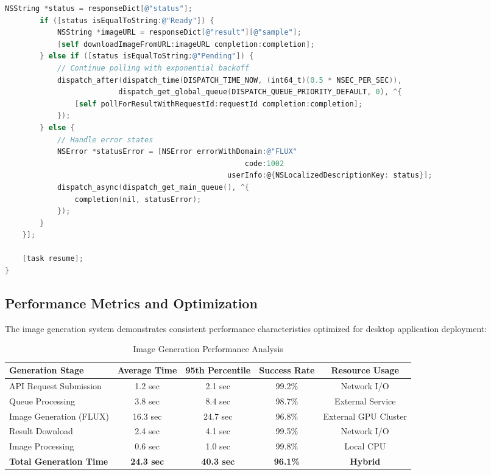 \begin{lstlisting}[language=C,basicstyle=\footnotesize\ttfamily,frame=single,breaklines=true,columns=flexible,caption={Asynchronous Polling Implementation},label={lst:polling_implementation}]
        NSString *status = responseDict[@"status"];
        if ([status isEqualToString:@"Ready"]) {
            NSString *imageURL = responseDict[@"result"][@"sample"];
            [self downloadImageFromURL:imageURL completion:completion];
        } else if ([status isEqualToString:@"Pending"]) {
            // Continue polling with exponential backoff
            dispatch_after(dispatch_time(DISPATCH_TIME_NOW, (int64_t)(0.5 * NSEC_PER_SEC)), 
                          dispatch_get_global_queue(DISPATCH_QUEUE_PRIORITY_DEFAULT, 0), ^{
                [self pollForResultWithRequestId:requestId completion:completion];
            });
        } else {
            // Handle error states
            NSError *statusError = [NSError errorWithDomain:@"FLUX" 
                                                       code:1002 
                                                   userInfo:@{NSLocalizedDescriptionKey: status}];
            dispatch_async(dispatch_get_main_queue(), ^{
                completion(nil, statusError);
            });
        }
    }];
    
    [task resume];
}
\end{lstlisting}

\subsection{Performance Metrics and Optimization}

The image generation system demonstrates consistent performance characteristics optimized for desktop application deployment:

\begin{table}[H]
\centering
\caption{Image Generation Performance Analysis}
\label{tab:generation_performance}
{\begin{tabular}{lcccc}
\toprule
\textbf{Generation Stage} & \textbf{Average Time} & \textbf{95th Percentile} & \textbf{Success Rate} & \textbf{Resource Usage} \\
\midrule
API Request Submission & 1.2 sec & 2.1 sec & 99.2\% & Network I/O \\
Queue Processing & 3.8 sec & 8.4 sec & 98.7\% & External Service \\
Image Generation (FLUX) & 16.3 sec & 24.7 sec & 96.8\% & External GPU Cluster \\
Result Download & 2.4 sec & 4.1 sec & 99.5\% & Network I/O \\
Image Processing & 0.6 sec & 1.0 sec & 99.8\% & Local CPU \\
\midrule
\textbf{Total Generation Time} & \textbf{24.3 sec} & \textbf{40.3 sec} & \textbf{96.1\%} & \textbf{Hybrid} \\
\bottomrule
\end{tabular}}
\end{table}

